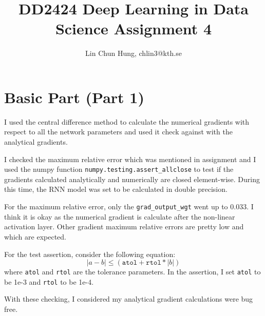 \documentclass[12pt]{article}
\newenvironment{question}[2][Question]{\begin{trivlist}
\kern10pt
\item[\hskip \labelsep {\bfseries #1}\hskip \labelsep {\bfseries #2.}]}{\end{trivlist}}
\begin{document}
\title{DD2424 Deep Learning in Data Science Assignment 4}
\author{Lin Chun Hung, chlin3@kth.se}

\maketitle

\section{Basic Part (Part 1)}

\begin{question}{i}
I used the central difference method to calculate the numerical gradients
with respect to all the network parameters and used it check against with the
analytical gradients.

I checked the maximum relative error which was mentioned in assignment and I 
used the numpy function \texttt{numpy.testing.assert\_allclose} to test if 
the gradients calculated analytically and numerically are closed element-wise.
During this time, the RNN model was set to be calculated in double precision. 

For the maximum relative error, only the \texttt{grad\_output\_wgt} went up to 
0.033. I think it is okay as the numerical gradient is calculate after the non-linear
activation layer. Other gradient maximum relative errors are pretty low and 
which are expected.

For the test assertion, consider the following equation:
\begin{equation*}
    |a - b| \leq (\texttt{atol} + \texttt{rtol} * |b|)
\end{equation*}
where \texttt{atol} and \texttt{rtol} are the tolerance parameters.
In the assertion, I set \texttt{atol} to be 1e-3 and \texttt{rtol} to be 1e-4.

With these checking, I considered my analytical gradient calculations were bug free.
\end{question}
\end{document}

